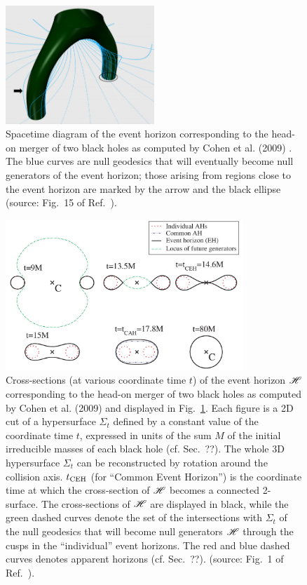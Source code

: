 \begin{figure}
\centerline{\includegraphics[width=0.5\textwidth]{glo_EH_headon_3d.jpg}}
\caption[]{\label{f:glo:EH_headon_3d} \footnotesize
Spacetime diagram of the event horizon corresponding to the head-on merger of
two black holes as computed by Cohen et al. (2009) \cite{CohenPS09}.
The blue curves are null geodesics that will eventually become null generators
of the event horizon; those arising from regions close to the event horizon
are marked by the arrow and the black ellipse
(source: Fig.~15 of Ref.~\cite{CohenPS09}).}
\end{figure}

\begin{figure}
\centerline{\includegraphics[width=0.8\textwidth]{glo_EH_headon.jpg}}
\caption[]{\label{f:glo:EH_headon} \footnotesize
Cross-sections (at various coordinate time $t$) of the event horizon $\mathscr{H}$ corresponding
to the head-on merger of two black holes as computed by Cohen et al. (2009) \cite{CohenPS09}
and displayed in Fig.~\ref{f:glo:EH_headon_3d}.
Each figure is a 2D cut of a hypersurface $\Sigma_t$ defined by a constant
value of the coordinate time $t$, expressed in units of the sum $M$ of the initial irreducible masses of each black
hole (cf. Sec.~??). The whole 3D hypersurface $\Sigma_t$ can be reconstructed
by rotation around the collision axis.
$t_{\rm CEH}$ (for ``Common Event Horizon'')
is the coordinate time at which the cross-section of $\mathscr{H}$ becomes a connected
2-surface.
The cross-sections of $\mathscr{H}$ are displayed
in black, while the green dashed curves denote the set of the intersections
with $\Sigma_t$ of the null geodesics that
will become null generators $\mathscr{H}$ through the cusps in the
``individual'' event horizons.
The red and blue dashed curves denotes apparent horizons (cf. Sec.~??).
(source: Fig.~1 of Ref.~\cite{CohenPS09}).}
\end{figure}


